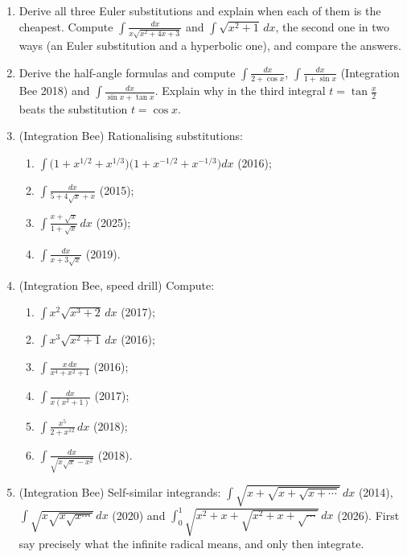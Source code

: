 \documentclass[11pt,a4paper]{article}
\begin{document}
\begin{enumerate}[itemsep=0.6em]
\item Derive all three Euler substitutions and explain when each of them is the cheapest. Compute
$\int\frac{dx}{x\sqrt{x^2+4x+3}}$ and $\int\sqrt{x^2+1}\,dx$, the second one in two ways (an Euler
substitution and a hyperbolic one), and compare the answers.

\item Derive the half-angle formulas and compute $\int\frac{dx}{2+\cos x}$, $\int\frac{dx}{1+\sin x}$
(Integration Bee 2018) and $\int\frac{dx}{\sin x+\tan x}$. Explain why in the third integral
$t=\tan\frac x2$ beats the substitution $t=\cos x$.

\item (Integration Bee) Rationalising substitutions:
\begin{enumerate}[label=\alph*),itemsep=0pt,topsep=0.3em]
\item $\displaystyle\int\bigl(1+x^{1/2}+x^{1/3}\bigr)\bigl(1+x^{-1/2}+x^{-1/3}\bigr)dx$ (2016);
\item $\displaystyle\int\frac{dx}{5+4\sqrt x+x}$ (2015);
\item $\displaystyle\int\frac{x+\sqrt x}{1+\sqrt x}\,dx$ (2025);
\item $\displaystyle\int\frac{dx}{x+3\sqrt x}$ (2019).
\end{enumerate}

\item (Integration Bee, speed drill) Compute:
\begin{enumerate}[label=\alph*),itemsep=0pt,topsep=0.3em]
\item $\int x^2\sqrt{x^3+2}\,dx$ (2017);
\item $\int x^3\sqrt{x^2+1}\,dx$ (2016);
\item $\int\frac{x\,dx}{x^4+x^2+1}$ (2016);
\item $\int\frac{dx}{x(x^2+1)}$ (2017);
\item $\int\frac{x^5}{2+x^{12}}\,dx$ (2018);
\item $\int\frac{dx}{\sqrt{x\sqrt x-x^2}}$ (2018).
\end{enumerate}

\item (Integration Bee) Self-similar integrands: $\displaystyle\int\sqrt{x+\sqrt{x+\sqrt{x+\cdots}}}\,dx$
(2014), $\displaystyle\int\sqrt{x\sqrt{x\sqrt{x\cdots}}}\,dx$ (2020) and
$\displaystyle\int_0^1\sqrt{x^2+x+\sqrt{x^2+x+\sqrt{\cdots}}}\,dx$ (2026). First say precisely what
the infinite radical means, and only then integrate.
\end{enumerate}
\end{document}
